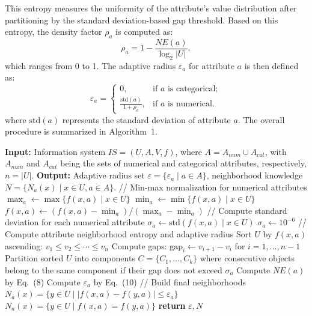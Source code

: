 \documentclass[lettersize,journal]{IEEEtran}
\begin{document}
This entropy measures the uniformity of the attribute's value distribution after partitioning by the
standard deviation-based gap threshold. Based on this entropy, the density factor \(\rho_{a}\) is
computed as:
\begin{equation}
\rho_{a} = 1 - \frac{NE(a)}{\log_{2}|U|},
\end{equation}
which ranges from 0 to 1. The adaptive radius \(\varepsilon_{a}\) for attribute \(a\) is then defined as:
\begin{equation}
\varepsilon_{a} = \begin{cases}
0, & \text{if } a \text{ is categorical}; \\[6pt]
\displaystyle\frac{\text{std}(a)}{1 + \rho_{a}}, & \text{if } a \text{ is numerical}.
\end{cases}
\end{equation}
where \(\text{std}(a)\) represents the standard deviation of attribute \(a\). The overall procedure is
summarized in Algorithm~1.

\begin{algorithm}[!t]
\caption{Neighborhood and Adaptive Radius Construction (NARC)}
\label{alg:narc}
\begin{algorithmic}
\STATE \textbf{Input:} Information system \(IS = (U, A, V, f)\), where \(A = A_{num} \cup A_{cat}\),
       with \(A_{num}\) and \(A_{cat}\) being the sets of numerical and categorical attributes,
       respectively, \(n = |U|\).
\STATE \textbf{Output:} Adaptive radius set \(\varepsilon = \{\varepsilon_{a} \mid a \in A\}\),
       neighborhood knowledge \(N = \{N_{a}(x) \mid x \in U, a \in A\}\).
\STATE
\STATE // Min-max normalization for numerical attributes
    \STATE \(\max_{a} \leftarrow \max\{f(x,a) \mid x \in U\}\)
    \STATE \(\min_{a} \leftarrow \min\{f(x,a) \mid x \in U\}\)
        \STATE \(f(x,a) \leftarrow (f(x,a) - \min_{a}) / (\max_{a} - \min_{a})\)
    \ENDFOR
\ENDFOR
\STATE
\STATE // Compute standard deviation for each numerical attribute
    \STATE \(\sigma_{a} \leftarrow \text{std}(f(x,a) \mid x \in U)\)
     \STATE \(\sigma_{a} \leftarrow 10^{-6}\) \ENDIF
\ENDFOR
\STATE
\STATE // Compute attribute neighborhood entropy and adaptive radius
    \STATE Sort \(U\) by \(f(x,a)\) ascending: \(v_{1} \leq v_{2} \leq \cdots \leq v_{n}\)
    \STATE Compute gaps: \(\text{gap}_{i} \leftarrow v_{i+1} - v_{i}\) for \(i = 1, \dots, n-1\)
    \STATE Partition sorted \(U\) into components \(C = \{C_{1}, \dots, C_{k}\}\) where consecutive
            objects belong to the same component if their gap does not exceed \(\sigma_{a}\)
    \STATE Compute \(NE(a)\) by Eq.~(8)
    \STATE Compute \(\varepsilon_{a}\) by Eq.~(10)
\ENDFOR
\STATE
\STATE // Build final neighborhoods
            \STATE \(N_{a}(x) = \{y \in U \mid |f(x,a) - f(y,a)| \leq \varepsilon_{a}\}\)
        \ELSE
            \STATE \(N_{a}(x) = \{y \in U \mid f(x,a) = f(y,a)\}\)
        \ENDIF
    \ENDFOR
\ENDFOR
\STATE \textbf{return} \(\varepsilon, N\)
\end{algorithmic}
\end{algorithm}
\end{document}
